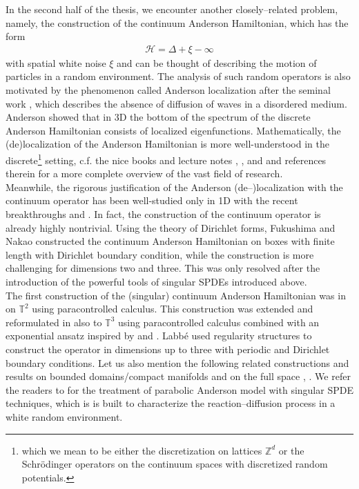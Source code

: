 In the second half of the thesis, we encounter another closely--related problem, namely, the construction of the continuum Anderson Hamiltonian, which has the form 
\begin{align*}
\mathcal{H} = \Delta + \xi - \infty
\end{align*}
with spatial white noise $\xi$ and can be thought of
describing the motion of particles in a random environment. The analysis of
such random operators is also motivated by the phenomenon called
Anderson localization after the seminal work {\cite{A58}}, which
describes the absence of diffusion of waves in a
disordered medium. Anderson showed that in 3D the bottom of
the spectrum of the discrete Anderson Hamiltonian consists
of localized eigenfunctions. Mathematically, the (de)localization of the
Anderson Hamiltonian is more well-understood in the discrete\footnote{which we
mean to be either the discretization on lattices $\mathbb{Z}^d$ or the
Schr{\"o}dinger operators on the continuum spaces with discretized random
potentials.} setting, c.f. the nice books and lecture notes {\cite{K07}},
{\cite{S11}}, {\cite{CL12}} and {\cite{K16}} and references therein for a more complete overview of the vast field of research. \\

Meanwhile, the rigorous justification of the Anderson (de--)localization with the continuum operator has been well-studied only in 1D with the recent breakthroughs {\cite{DL20}} and {\cite{DL24}}. In fact, the construction of the continuum operator is already highly nontrivial. Using the theory of Dirichlet forms, Fukushima and Nakao {\cite{FN77}}
constructed the continuum Anderson Hamiltonian on boxes with finite length with Dirichlet boundary condition, while the construction is more challenging for dimensions two and three. This was only resolved after the introduction of the powerful tools of singular SPDEs introduced above. \\

The first construction of the (singular) continuum Anderson Hamiltonian was in {\cite{AC15}} on $\mathbb{T}^2$ using paracontrolled calculus. This construction was extended and reformulated in {\cite{GUZ20}} also to $\mathbb{T}^3$ using paracontrolled calculus combined with an exponential ansatz inspired by {\cite{HL15}} and {\cite{DW18}}. Labb{\'e} {\cite{Lab19}} used regularity structures to construct the operator in dimensions up to three with periodic and Dirichlet boundary conditions. Let us also mention the following related constructions and results on bounded domains/compact manifolds {\cite{CvZ21,MvZ22,BDM22,M22,MOsimple}} and on the full space {\cite{Ueki}}, {\cite{HL24}}. We refer the readers to \cite{shen2024globalwellposedness2dgeneralized,chandra2025prioribounds2dgeneralised} for the treatment of parabolic Anderson model with singular SPDE techniques, which is is built to characterize the reaction--diffusion process in a white random environment. 

